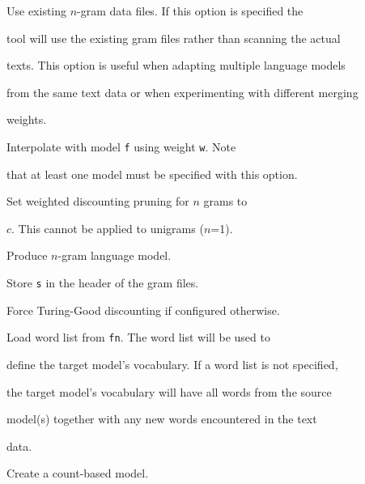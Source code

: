 \begin{optlist}
   Use existing $n$-gram data files. If this option is specified the


	tool will use the existing gram files rather than scanning the actual


	texts. This option is useful when adapting multiple language models


	from the same text data or when experimenting with different merging


	weights.





   Interpolate with model {\tt f} using weight {\tt w}. Note 


        that at least one model must be specified with this option.





   Set weighted discounting pruning for $n$ grams to


        $c$. This cannot be applied to unigrams ($n$=1).





   Produce $n$-gram language model.





   Store {\tt s} in the header of the gram files.





   Force Turing-Good discounting if configured otherwise.





   Load word list from {\tt fn}. The word list will be used to


	define the target model's vocabulary. If a word list is not specified,


	the target model's vocabulary will have all words from the source


	model(s) together with any new words encountered in the text


	data.





   Create a count-based model.


\end{optlist}







